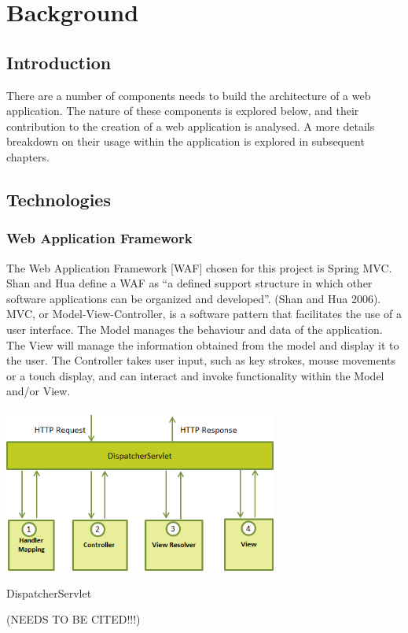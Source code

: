 \chapter{Background}
\label{background}

\section{Introduction}

There are a number of components needs to build the architecture of a web application. The nature of these components is explored below, and their contribution to the creation of a web application is analysed. A more details breakdown on their usage within the application is explored in subsequent chapters.

\section{Technologies}

\subsection{Web Application Framework}
The Web Application Framework [WAF] chosen for this project is Spring MVC. Shan and Hua define a WAF as “a defined support structure in which other software applications can be organized and developed”. (Shan and Hua 2006). MVC, or Model-View-Controller, is a software pattern that facilitates the use of a user interface. The Model manages the behaviour and data of the application. The View will manage the information obtained from the model and display it to the user. The Controller takes user input, such as key strokes, mouse movements or a touch display, and can interact and invoke functionality within the Model and/or View.

\begin{table}[H]
\begin{center}
\includegraphics[width=9cm]{dispatchservlet.png}
\end{center}
\caption{DispatcherServlet }
\label{fig:dispatcherflow}
\end{table}
(NEEDS TO BE CITED!!!)

